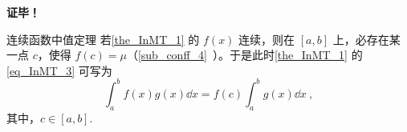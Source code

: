 \textbf{证毕！}

\begin{example}{连续函数中值定理}
若\autoref{the_InMT_1} 的 $f(x)$ 连续，则在 $[a,b]$ 上，必存在某一点 $c$，使得 $f(c)=\mu$（\autoref{sub_conff_4}~）。于是此时\autoref{the_InMT_1} 的\autoref{eq_InMT_3} 可写为
\begin{equation}
\int_a^b f(x)g(x)\dd x=f(c)\int_a^b g(x)\dd x~,
\end{equation}
其中，$c\in[a,b].$
\end{example}